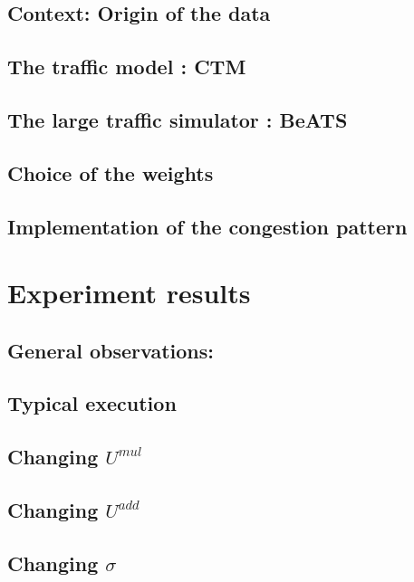 \subsection{Context: Origin of the data}
\label{subsec:pems}

\subsection{The traffic model : CTM}
\label{ctm}

\subsection{The large traffic simulator : BeATS}
\label{subsec:beats}

\subsection{Choice of the weights}
\label{subsec:weights_choice}

\subsection{Implementation of the congestion pattern}
\label{subsec:cpimplementation}







\section{Experiment results}
\subsection{General observations:}
\label{subsec:results_intro}

\subsection{Typical execution}
\label{subsec:typical}

\subsection{Changing $U^{mul}$}
\label{subsec:umul}

\subsection{Changing $U^{add}$}
\label{subsec:uadd}

\subsection{Changing $\sigma$}
\label{subsec:sigma}

